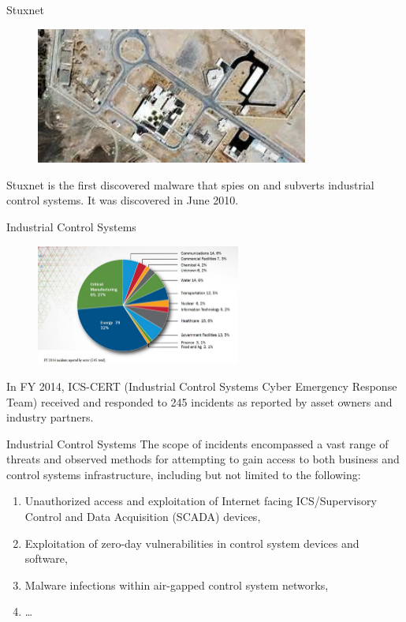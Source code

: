 \documentclass{beamer}
\begin{document}
\begin{frame}{Stuxnet}
  \begin{figure}[ht]
    \centering
    \includegraphics[width=0.8\textwidth]{stuxnet.jpg}
  \end{figure}
  Stuxnet is the first discovered malware that spies on and subverts industrial control systems. It was discovered in June 2010. 
\end{frame}

\begin{frame}{Industrial Control Systems}
  \begin{figure}[ht]
    \centering
    \includegraphics[width=0.6\textwidth]{cert.jpg}
  \end{figure}
 In FY 2014, ICS-CERT (Industrial Control Systems Cyber Emergency Response Team) received and responded to 245 incidents as reported by asset owners and industry partners.
\end{frame}


\begin{frame}{Industrial Control Systems}
   The scope of incidents encompassed a vast range of threats and observed methods for attempting to gain access to both business and control systems infrastructure, including but not limited to the following:
  \begin{enumerate}
  \item  Unauthorized access and exploitation of Internet facing ICS/Supervisory Control and Data Acquisition (SCADA) devices,
  \item 	 Exploitation of zero-day vulnerabilities in control system devices and software, 
  \item  	 Malware infections within air-gapped control system networks,
  \item \dots
  \end{enumerate}

\end{frame}
\end{document}
